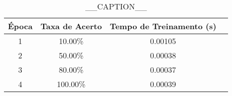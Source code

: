 \begin{table}[H]
\centering
\begin{tabular}{|c|c|c|c|}
\hline
Época & Taxa de Acerto & Tempo de Treinamento (s) \\
\hline
1 & 10.00\% & 0.00105 \\
2 & 50.00\% & 0.00038 \\
3 & 80.00\% & 0.00037 \\
4 & 100.00\% & 0.00039 \\
\hline
\end{tabular}
\caption{__CAPTION__}
\label{tab:__label__}
\end{table}